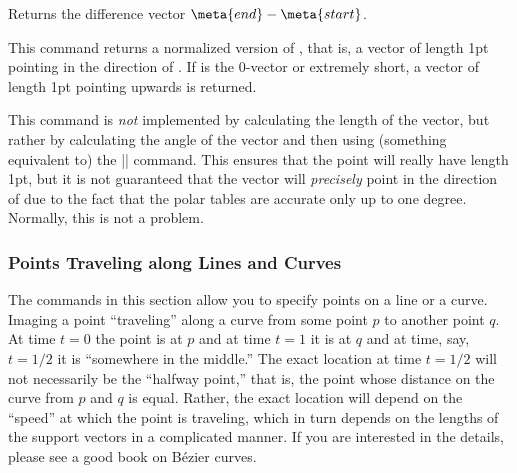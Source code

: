 \begin{command}{\pgfpointdiff{}}
  Returns the difference vector $\meta{end} - \meta{start}$.
\begin{codeexample}[]
\end{codeexample}
\end{command}


\begin{command}{\pgfpointnormalised{}}
  This command returns a normalized version of , that is,
  a vector of length 1pt pointing in the direction of . If
   is the $0$-vector or extremely short, a vector of
  length 1pt pointing upwards is returned.

  This command is \emph{not} implemented by calculating the length of
  the vector, but rather by calculating the angle of the vector and
  then using (something equivalent to) the |\pgfpointpolar|
  command. This ensures that the point will really have length 1pt,
  but it is not guaranteed that the vector will \emph{precisely} point
  in the direction of  due to the fact that the polar
  tables are accurate only up to one degree. Normally, this is not a
  problem.
\begin{codeexample}[]
\end{codeexample}
\end{command}


\subsubsection{Points Traveling along Lines and Curves}

\label{section-pointsattime}

The commands in this section allow you to specify points on a line or
a curve. Imaging a point ``traveling'' along a curve from some point
$p$ to another point $q$. At time $t=0$ the point is at $p$ and at
time $t=1$ it is at $q$ and at time, say, $t=1/2$ it is ``somewhere in
the middle.'' The exact location at time $t=1/2$ will not necessarily
be the ``halfway point,'' that is, the point whose distance on the
curve from $p$ and $q$ is equal. Rather, the exact location will
depend on the ``speed'' at which the point is traveling, which in
turn depends on the lengths of the support vectors in a complicated
manner. If you are interested in the details, please see a good book
on Bézier curves.



